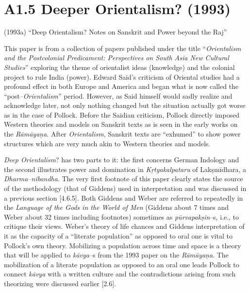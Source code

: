 {{\vspace{-.5cm}

\section*{A1.5 Deeper Orientalism? (1993)}

(1993a) “Deep Orientalism? Notes on Sanskrit and Power beyond the Raj”

\newpage

This paper is from a collection of papers published under the title “\textit{Orientalism and the Postcolonial Predicament: Perspectives on South Asia New Cultural Studies}” exploring the theme of orientalist ideas (knowledge) and the colonial project to rule India (power). Edward Said’s criticism of Oriental studies had a profound effect in both Europe and America and began what is now called the “post–\textit{Orientalism}” period. However, as Said himself would sadly realize and acknowledge later, not only nothing changed but the situation actually got worse as in the case of Pollock. Before the Saidian criticism, Pollock directly imposed Western theories and models on Sanskrit texts as is seen in the early works on the \textit{Rāmāyaṇa}. After \textit{Orientalism}, Sanskrit texts are “exhumed” to show power structures which are very much akin to Western theories and models.

\textit{Deep Orientalism}? has two parts to it: the first concerns German Indology and the second illustrates power and domination in \textit{Kṛtyakalpataru} of Lakṣmīdhara, a \textit{Dharma–nibandha}. The very first footnote of this paper clearly states the source of the methodology (that of Giddens) used in interpretation and was discussed in a previous section [4.6.5]. Both Giddens and Weber are referred to repeatedly in the \textit{Language of the Gods in the World of Men }(Giddens about 7 times and Weber about 32 times including footnotes) sometimes as \textit{pūrvapakṣin}–s, i.e., to critique their views. Weber’s theory of life chances and Giddens interpretation of it as the capacity of a “literate population” as opposed to oral one is vital to Pollock’s own theory. Mobilizing a population across time and space is a theory that will be applied to \textit{kāvya}–s from the 1993 paper on the\textit{ Rāmāyaṇa}. The mobilization of a literate population as opposed to an oral one leads Pollock to connect \textit{kāvya} with a written culture and the contradictions arising from such theorizing were discussed earlier [2.6].

}}
